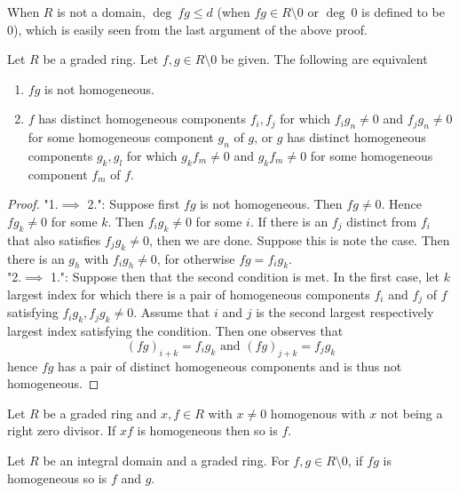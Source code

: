     \begin{remark}
        When $R$ is not a domain, $\deg\ fg\leq d$ (when $fg\in R\setminus 0$ or $\deg\ 0$ is defined to be $0$), which is easily seen from the last argument of the above proof. 
    \end{remark}
    \begin{lemma}\label{ProductOfHomogeneousElements}
        Let $R$ be a graded ring. Let $f,g\in R\setminus 0$ be given. The following are equivalent
        \begin{enumerate}
            \item $fg$ is not homogeneous.
            \item $f$ has distinct homogeneous components $f_i,f_j$ for which $f_ig_n \neq 0$ and $f_jg_n\neq 0$ for some homogeneous component $g_n$ of $g$, or $g$ has distinct homogeneous components $g_k,g_l$ for which $g_kf_m\neq 0$ and $g_kf_m\neq 0$ for some homogeneous component $f_m$ of $f$.
        \end{enumerate}
    \end{lemma}
    \begin{proof}
        "1.$\implies$ 2.": Suppose first $fg$ is not homogeneous. Then $fg\neq 0$. Hence $fg_k\neq 0$ for some $k$. Then $f_ig_k\neq 0$ for some $i$. If there is an $f_j$ distinct from $f_i$ that also satisfies $f_jg_k\neq0$, then we are done. Suppose this is note the case. Then there is an $g_h$ with $f_ig_h\neq 0$, for otherwise $fg= f_ig_k$.\\
        "2.$\implies$ 1.": Suppose then that the second condition is met. In the first case, let $k$ largest index for which there is a pair of homogeneous components $f_i$ and $f_j$ of $f$ satisfying $f_ig_k,f_jg_k\neq 0$. Assume that $i$ and $j$ is the second largest respectively largest index satisfying the condition. Then one observes that
        $$
            (fg)_{i+k}= f_ig_k \text{ and } (fg)_{j+k} = f_jg_k
        $$     
        hence $fg$ has a pair of distinct homogeneous components and is thus not homogeneous.
    \end{proof}
    \begin{corollary}
        Let $R$ be a graded ring and $x,f\in R$ with $x\neq 0$ homogenous with $x$ not being a right zero divisor. If $xf$ is homogeneous then so is $f$.  
    \end{corollary}
    \begin{corollary}
        Let $R$ be an integral domain and a graded ring. For $f,g\in R\setminus 0$, if $fg$ is homogeneous so is $f$ and $g$.
    \end{corollary}
